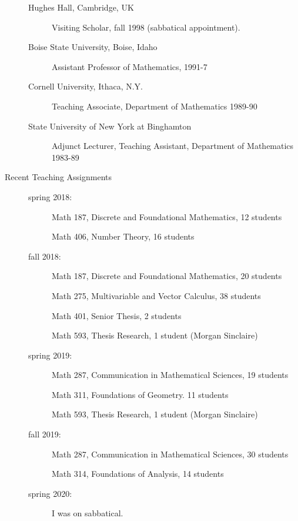 \begin{description}
\begin{description}
		\item[Hughes Hall, Cambridge, UK]  Visiting Scholar, fall 1998 (sabbatical appointment).
 
                \item[Boise State University, Boise, Idaho] Assistant Professor of
Mathematics, 1991-7
                \item[Cornell University, Ithaca, N.Y.] Teaching Associate, Department
of Mathematics 1989-90
                \item[State University of New York at Binghamton] Adjunct Lecturer,
Teaching Assistant, Department of Mathematics 1983-89
        \end{description}

\newpage

\item[Recent Teaching Assignments]

\begin{description}

\item[]

\item[spring 2018:]

Math 187, Discrete and Foundational Mathematics, 12 students

Math 406, Number Theory, 16 students

\item[fall 2018:]

Math 187, Discrete and Foundational Mathematics, 20 students

Math 275, Multivariable and Vector Calculus, 38 students

Math 401, Senior Thesis, 2 students

Math 593, Thesis Research, 1 student (Morgan Sinclaire)

\item[spring 2019:]

Math 287, Communication in Mathematical Sciences, 19 students

Math 311, Foundations of Geometry. 11 students

Math 593, Thesis Research, 1 student (Morgan Sinclaire)

\item[fall 2019:]

Math 287, Communication in Mathematical Sciences, 30 students

Math 314, Foundations of Analysis, 14 students

\item[spring 2020:]  I was on sabbatical.


\end{description}
\end{description}
